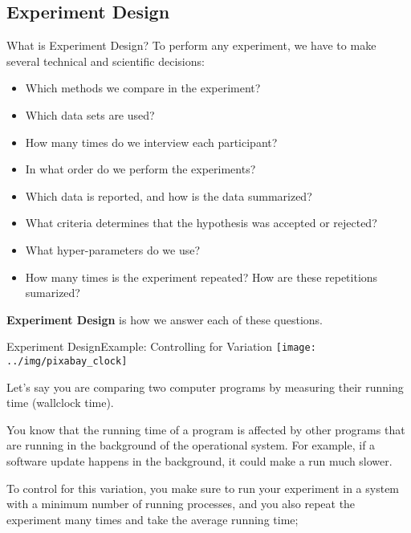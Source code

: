 \subsection{Experiment Design}
\begin{frame}{What is Experiment Design?}
  To perform any experiment, we have to make several technical and scientific decisions:
  \begin{itemize}
    \item Which methods we compare in the experiment?
    \item Which data sets are used?
    \item How many times do we interview each participant?
    \item In what order do we perform the experiments?
    \item Which data is reported, and how is the data summarized?
    \item What criteria determines that the hypothesis was accepted or rejected?
    \item What hyper-parameters do we use?
    \item How many times is the experiment repeated? How are these repetitions sumarized?
  \end{itemize}
  {\bf Experiment Design} is how we answer each of these questions.
\end{frame}


\begin{frame}{Experiment Design}{Example: Controlling for Variation}
  \hfill\texttt{[image: ../img/pixabay\_clock]}

  Let's say you are comparing two computer programs by measuring their running time (wallclock time).
  \bigskip

  You know that the running time of a program is affected by other programs that are running in the background of the operational system. For example, if a software update happens in the background, it could make a run much slower.
  \bigskip

  To control for this variation, you make sure to run your experiment in a system with a minimum number of running processes, and you also repeat the experiment many times and take the average running time;
\end{frame}

